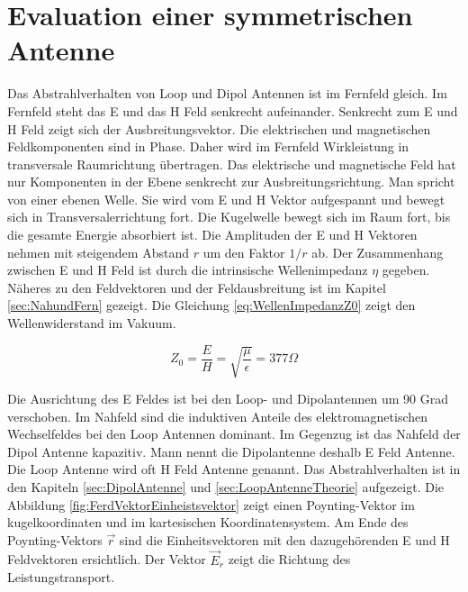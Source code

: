 
\newpage
\section{Evaluation einer symmetrischen Antenne}
Das Abstrahlverhalten von Loop und Dipol Antennen ist im Fernfeld gleich. Im Fernfeld steht das E und das H Feld senkrecht aufeinander. Senkrecht zum E und H Feld zeigt sich der Ausbreitungsvektor. Die elektrischen und
magnetischen Feldkomponenten sind in Phase. Daher wird im Fernfeld Wirkleistung in transversale Raumrichtung
übertragen. Das elektrische und magnetische Feld hat nur Komponenten in der Ebene senkrecht zur Ausbreitungsrichtung.
Man spricht von einer ebenen Welle. Sie wird vom E und H Vektor aufgespannt  und bewegt sich in
Transversalerrichtung fort. Die Kugelwelle bewegt sich im Raum fort, bis die gesamte Energie absorbiert ist. Die Amplituden der E und H Vektoren
nehmen mit steigendem Abstand $r$ um den Faktor $1/r$  ab. Der Zusammenhang zwischen E und H Feld ist
durch die intrinsische Wellenimpedanz $\eta$ gegeben. Näheres zu den Feldvektoren und der Feldausbreitung ist im Kapitel \ref{sec:NahundFern} gezeigt.
Die Gleichung \ref{eq:WellenImpedanzZ0} zeigt den Wellenwiderstand im Vakuum\cite{elliott1981antenna}.


\begin{equation}\label{eq:WellenImpedanzZ0}
Z_{0}=\dfrac{E}{H}=\sqrt{\dfrac{\mu}{\epsilon}}=377\Omega
\end{equation}
\cite{rothammel1991antennenbuch}
\cite{elliott1981antenna}
\cite{Harrington-TimeHarmonic}
\cite{Emant}

Die Ausrichtung des E Feldes ist bei den Loop- und  Dipolantennen um 90 Grad verschoben. 
Im Nahfeld sind die induktiven Anteile des elektromagnetischen Wechselfeldes bei den Loop Antennen dominant. 
Im Gegenzug ist das Nahfeld der Dipol Antenne  kapazitiv.
Mann nennt die Dipolantenne deshalb E Feld Antenne.  Die Loop Antenne wird oft H Feld Antenne genannt.
Das Abstrahlverhalten ist in den Kapiteln \ref{sec:DipolAntenne} und \ref{sec:LoopAntenneTheorie} aufgezeigt. Die Abbildung \ref{fig:FerdVektorEinheistsvektor} zeigt einen Poynting-Vektor im  kugelkoordinaten und im kartesischen Koordinatensystem. Am Ende des Poynting-Vektors $\vec{r}$  sind die Einheitsvektoren mit den dazugehörenden  E und H Feldvektoren ersichtlich\cite{Emant}. Der Vektor $\vec{E}_r$ zeigt die Richtung des Leistungstransport.\\



